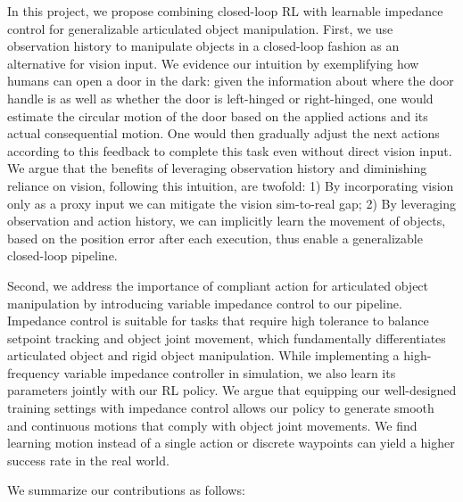In this project, we propose combining closed-loop RL with learnable impedance control for generalizable articulated object manipulation. First, we use observation history to manipulate objects in a closed-loop fashion as an alternative for vision input. We evidence our intuition by exemplifying how humans can open a door in the dark: given the information about where the door handle is as well as whether the door is left-hinged or right-hinged, one would estimate the circular motion of the door based on the applied actions and its actual consequential motion. One would then gradually adjust the next actions according to this feedback to complete this task even without direct vision input. We argue that the benefits of leveraging observation history and diminishing reliance on vision, following this intuition, are twofold: 1) By incorporating vision only as a proxy input we can mitigate the vision sim-to-real gap; 2) By leveraging observation and action history, we can implicitly learn the movement of objects, based on the position error after each execution, thus enable a generalizable closed-loop pipeline.

Second, we address the importance of compliant action for articulated object manipulation by introducing variable impedance control to our pipeline. Impedance control is suitable for tasks that require high tolerance to balance setpoint tracking and object joint movement, which fundamentally differentiates articulated object and rigid object manipulation. While implementing a high-frequency variable impedance controller in simulation, we also learn its parameters jointly with our RL policy. We argue that equipping our well-designed training settings with impedance control allows our policy to generate smooth and continuous motions that comply with object joint movements. We find learning motion instead of a single action or discrete waypoints \cite{vatmart, where2act, where2explore} can yield a higher success rate in the real world.

We summarize our contributions as follows:

